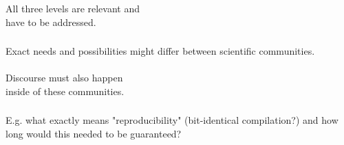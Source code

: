 \documentclass{beamer}
\begin{document}
\begin{frame}
  \frametitle{}
  \begin{block}{}
    \begin{center}
      All three levels are relevant and\\have to be addressed.
    \end{center}
  \end{block}
\end{frame}


\begin{frame}
  \frametitle{}
  \begin{block}{}
    \begin{center}
      Exact needs and possibilities might differ between scientific
      communities.\\\ \\
      Discourse must also happen\\inside of these  communities.
    \end{center}
  \end{block}
\end{frame}

\begin{frame}
  \frametitle{}
  \begin{block}{}
    \begin{center}
      E.g. what exactly means "reproducibility" (bit-identical
      compilation?) and how long would this needed to be guaranteed?
    \end{center}
  \end{block}
\end{frame}


\end{document}
